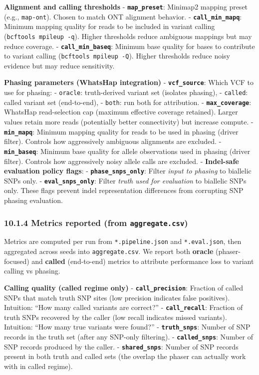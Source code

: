 \documentclass[
]{article}
\begin{document}
\textbf{Alignment and calling thresholds} -
\textbf{\texttt{map\_preset}}: Minimap2 mapping preset (e.g.,
\texttt{map-ont}). Chosen to match ONT alignment behavior. -
\textbf{\texttt{call\_min\_mapq}}: Minimum mapping quality for reads to
be included in variant calling (\texttt{bcftools\ mpileup\ -q}). Higher
thresholds reduce ambiguous mappings but may reduce coverage. -
\textbf{\texttt{call\_min\_baseq}}: Minimum base quality for bases to
contribute to variant calling (\texttt{bcftools\ mpileup\ -Q}). Higher
thresholds reduce noisy evidence but may reduce sensitivity.

\textbf{Phasing parameters (WhatsHap integration)} -
\textbf{\texttt{vcf\_source}}: Which VCF to use for phasing: -
\texttt{oracle}: truth-derived variant set (isolates phasing), -
\texttt{called}: called variant set (end-to-end), - \texttt{both}: run
both for attribution. - \textbf{\texttt{max\_coverage}}: WhatsHap
read-selection cap (maximum effective coverage retained). Larger values
retain more reads (potentially better connectivity) but increase
compute. - \textbf{\texttt{min\_mapq}}: Minimum mapping quality for
reads to be used in phasing (driver filter). Controls how aggressively
ambiguous alignments are excluded. - \textbf{\texttt{min\_baseq}}:
Minimum base quality for allele observations used in phasing (driver
filter). Controls how aggressively noisy allele calls are excluded. -
\textbf{Indel-safe evaluation policy flags}: -
\textbf{\texttt{phase\_snps\_only}}: Filter \emph{input to phasing} to
biallelic SNPs only. - \textbf{\texttt{eval\_snps\_only}}: Filter
\emph{truth used for evaluation} to biallelic SNPs only. These flags
prevent indel representation differences from corrupting SNP phasing
evaluation.

\subsubsection{\texorpdfstring{10.1.4 Metrics reported (from
\texttt{aggregate.csv})}{10.1.4 Metrics reported (from aggregate.csv)}}\label{metrics-reported-from-aggregate.csv}

Metrics are computed per run from \texttt{*.pipeline.json} and
\texttt{*.eval.json}, then aggregated across seeds into
\texttt{aggregate.csv}. We report both \textbf{oracle} (phaser-focused)
and \textbf{called} (end-to-end) metrics to attribute performance loss
to variant calling vs phasing.

\textbf{Calling quality (called regime only)} -
\textbf{\texttt{call\_precision}}: Fraction of called SNPs that match
truth SNP sites (low precision indicates false positives).\\
Intuition: ``How many called variants are correct?'' -
\textbf{\texttt{call\_recall}}: Fraction of truth SNPs recovered by the
caller (low recall indicates missed variants).\\
Intuition: ``How many true variants were found?'' -
\textbf{\texttt{truth\_snps}}: Number of SNP records in the truth set
(after any SNP-only filtering). - \textbf{\texttt{called\_snps}}: Number
of SNP records produced by the caller. - \textbf{\texttt{shared\_snps}}:
Number of SNP records present in both truth and called sets (the overlap
the phaser can actually work with in called regime).
\end{document}
